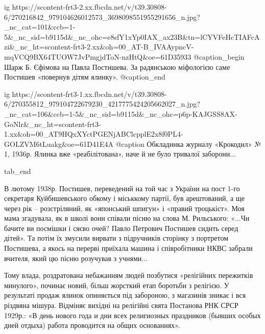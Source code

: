   ig https://scontent-frt3-2.xx.fbcdn.net/v/t39.30808-6/270216842_979104626012573_3698098551955291656_n.jpg?_nc_cat=101&ccb=1-5&_nc_sid=b9115d&_nc_ohc=e8sfY1xYp0IAX_ax23B&tn=lCYVFeHcTIAFcAzi&_nc_ht=scontent-frt3-2.xx&oh=00_AT-B_IVAAypncV-mqVCQ9BX64TUOW7JvPmgjdToN-nzHtQ&oe=61D35933
	@caption_begin
		Шарж Б. Єфімова на Павла Постишева. За радянською міфологією саме Постишев «повернув дітям ялинку».
	@caption_end

  ig https://scontent-frt3-1.xx.fbcdn.net/v/t39.30808-6/270355812_979104722679230_4217775424205662027_n.jpg?_nc_cat=106&ccb=1-5&_nc_sid=b9115d&_nc_ohc=p6p-KAJGSS8AX-GoNlr&_nc_ht=scontent-frt3-1.xx&oh=00_AT9HQxXYctPGENjABClcpplE2x8f0PL4-GOLZVM6tLuakg&oe=61D41E4A
	@caption Обкладинка журналу «Крокодил» № 1, 1936р. Ялинка вже «реабілітована», наче й не було тривалої заборони...

tab_end
\fi

\begin{zznagolos}
\normalsize
В лютому 1938р. Постишев, переведений на той час з України на пост 1-го
секретаря Куйбишевського обкому і міськкому партії, був арештований, а ще
через рік – розстріляний, як «японський шпигун» і «правий троцькіст».
Моя мама згадувала, як в школі вони співали пісню на слова М. Рильського: «...Чи
бачите ви посмішки і сяєво очей?  Павло Петрович Постишев сидить серед дітей».
Та потім їх змусили вирвати з підручників сторінку з портретом Постишева, а
якось на перерві приїхала машина і співробітники НКВС забрали вчителя, який цю
пісню розучував з учнями...
\end{zznagolos}





Тому влада, роздратована небажанням людей позбутися «релігійних пережитків
минулого», починає новий, більш жорсткий етап боротьби з релігією. У результаті
продаж ялинок опиняється під забороною, з магазинів зникає і вся різдвяна
мішура. Відміняє вихідні на релігійні свята Постанова РНК СРСР 1929р.: «В день
нового года и дни всех религиозных праздников (бывших особых дней отдыха)
работа проводится на общих основаниях».


